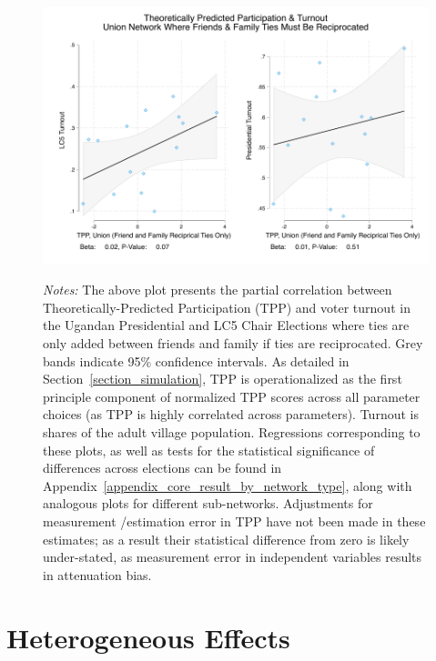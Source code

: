 \documentclass[12pt]{article}
\begin{document}
\begin{appendix}
\begin{figure}[h!]
	\begin{center}
	    \caption{}\label{figure_context_voting_scatter_reciponly}
    		\includegraphics[width=\textwidth]{../3_results/context_voting_scatter_reciponly.pdf}
		\end{center}
			\scriptsize{\emph{Notes:}  The above plot presents the partial correlation between Theoretically-Predicted Participation (TPP) and voter turnout in the Ugandan Presidential and LC5 Chair Elections where ties are only added between friends and family if ties are reciprocated.  Grey bands indicate 95\% confidence intervals.  As detailed in Section~\ref{section_simulation}, TPP is operationalized as the first principle component of normalized TPP scores across all parameter choices (as TPP is highly correlated across parameters). Turnout is shares of the adult village population. Regressions corresponding to these plots, as well as tests for the statistical significance of differences across elections can be found in Appendix~\ref{appendix_core_result_by_network_type}, along with analogous plots for different sub-networks. Adjustments for measurement /estimation error in TPP have not been made in these estimates; as a result their statistical difference from zero is likely under-stated, as measurement error in independent variables results in attenuation bias.}
\end{figure}
\pagebreak

\section{Heterogeneous Effects}\label{appendix_heterogeneous_by_blockvoting}


\end{appendix}
\end{document}
